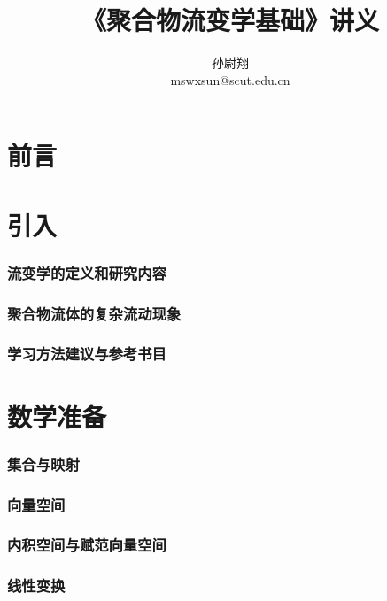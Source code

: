 \documentclass[zihao=-4,linespread=1.5,heading=true,a4paper,twoside]{ctexart}
\title{《聚合物流变学基础》讲义}
\author{孙尉翔\\mswxsun@scut.edu.cn}
\begin{document}
\begin{titlepage}
\maketitle
\end{titlepage}

\part*{前言}\label{sec:preface}


\newpage\tableofcontents

\newpage\part{引入}
\section{流变学的定义和研究内容}\label{sec:I.1}

\section{聚合物流体的复杂流动现象}\label{sec:I.2}

\section{学习方法建议与参考书目}\label{sec:I.3}


\newpage\part{数学准备}
\section{集合与映射}\label{sec:II.1}


\section{向量空间}\label{sec:II.2}


\section{内积空间与赋范向量空间}\label{sec:II.3}


\section{线性变换}\label{sec:II.4}
\end{document}
